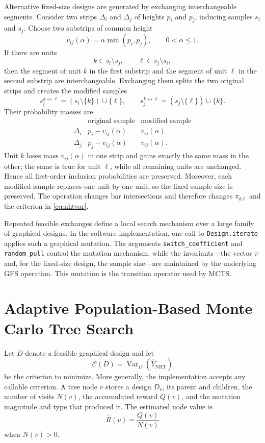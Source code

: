 \documentclass[twoside]{article}
\newcommand{\NHT}{\mathrm{NHT}}
\newcommand{\Var}{\operatorname{Var}}
\newcommand{\Crit}{\mathcal{C}}
\begin{document}
Alternative fixed-size designs are generated by exchanging interchangeable
segments. Consider two strips $\Delta_i$ and $\Delta_j$ of heights $p_i$ and
$p_j$, inducing samples $s_i$ and $s_j$. Choose two substrips of common height
\begin{equation}\label{eq:vij}
    v_{ij}(\alpha)=\alpha\min(p_i,p_j),\qquad 0<\alpha\leq1.
\end{equation}
If there are units
\[
    k\in s_i\setminus s_j,
    \qquad
    \ell\in s_j\setminus s_i,
\]
then the segment of unit $k$ in the first substrip and the segment of unit
$\ell$ in the second substrip are interchangeable. Exchanging them splits the
two original strips and creates the modified samples
\[
    s_i^{k\leftrightarrow\ell}=(s_i\setminus\{k\})\cup\{\ell\},
    \qquad
    s_j^{k\leftrightarrow\ell}=(s_j\setminus\{\ell\})\cup\{k\}.
\]
Their probability masses are
\[
\begin{array}{c|cc}
 & \text{original sample} & \text{modified sample}\\ \hline
\Delta_i & p_i-v_{ij}(\alpha) & v_{ij}(\alpha)\\
\Delta_j & p_j-v_{ij}(\alpha) & v_{ij}(\alpha).
\end{array}
\]
Unit $k$ loses mass $v_{ij}(\alpha)$ in one strip and gains exactly the same
mass in the other; the same is true for unit $\ell$, while all remaining units
are unchanged. Hence all first-order inclusion probabilities are preserved.
Moreover, each modified sample replaces one unit by one unit, so the fixed
sample size is preserved. The operation changes bar intersections and therefore
changes $\pi_{k\ell}$ and the criterion in \eqref{eq:nhtvar}.

Repeated feasible exchanges define a local search mechanism over a large
family of graphical designs. In the software implementation, one call to
{\tt Design.iterate} applies such a graphical mutation. The arguments
{\tt switch\_coefficient} and {\tt random\_pull} control the mutation mechanism,
while the invariants---the vector $\pi$ and, for the fixed-size design, the
sample size---are maintained by the underlying GFS operation. This mutation is
the transition operator used by MCTS.

\section{Adaptive Population-Based Monte Carlo Tree Search}

Let $D$ denote a feasible graphical design and let
\[
    \Crit(D)=\Var_D(\widehat Y_{\NHT})
\]
be the criterion to minimize. More generally, the implementation accepts any
callable criterion. A tree node $v$ stores a design $D_v$, its parent and
children, the number of visits $N(v)$, the accumulated reward $Q(v)$, and the
mutation magnitude and type that produced it. The estimated node value is
\[
    \overline R(v)=\frac{Q(v)}{N(v)}
\]
when $N(v)>0$.
\end{document}
